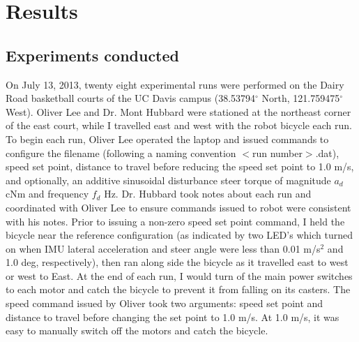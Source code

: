 \section{Results} \label{rb:sec:experiments}

\subsection{Experiments conducted} \label{rb:subsec:experiments}
On July 13, 2013, twenty eight experimental runs were performed on the Dairy
Road basketball courts of the UC Davis campus (38.53794$^{\circ}$ North,
121.759475$^{\circ}$ West). Oliver Lee and Dr. Mont Hubbard were stationed at the
northeast corner of the east court, while I travelled east and west with the
robot bicycle each run. To begin each run, Oliver Lee operated the laptop and
issued commands to configure the filename (following a naming convention $<$run
number$>$.dat), speed set point, distance to travel before reducing the speed
set point to 1.0 m/s, and optionally, an additive sinusoidal disturbance steer
torque of magnitude $a_d$ cNm and frequency $f_d$ Hz. Dr. Hubbard took notes
about each run and coordinated with Oliver Lee to ensure commands issued to robot
were consistent with his notes. Prior to issuing a non-zero speed set point
command, I held the bicycle near the reference configuration (as indicated by
two LED's which turned on when IMU lateral acceleration and steer angle were
less than 0.01 m/s$^2$ and 1.0 deg, respectively), then ran along side the
bicycle as it travelled east to west or west to East. At the end of each run, I
would turn of the main power switches to each motor and catch the bicycle to
prevent it from falling on its casters.  The speed command issued by Oliver
took two arguments: speed set point and distance to travel before changing the
set point to 1.0 m/s. At 1.0 m/s, it was easy to manually switch off the motors
and catch the bicycle.

